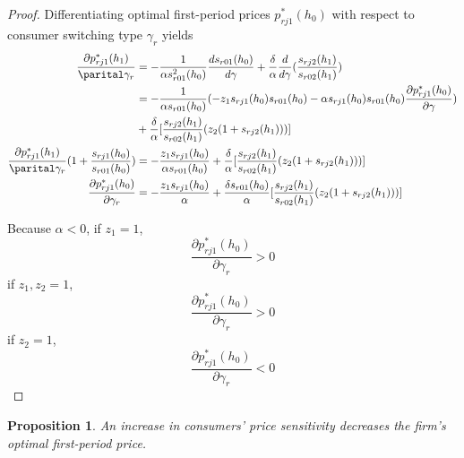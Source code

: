 \documentclass[12pt]{article}
\newtheorem{proposition}{Proposition}
\theoremstyle{definition}
\theoremstyle{remark}
\begin{document}
\begin{proof}
  Differentiating optimal first-period prices $p_{rj1}^*(h_0)$ with respect to
  consumer switching type $\gamma_r$ yields
  \begin{align*}
    \frac{\partial p_{rj1}^*(h_1)}{\parital\gamma_r} &= -\frac{1}{\alpha
    s_{r01}^2(h_0)}\frac{ds_{r01}(h_0)}{d\gamma} +
    \frac{\delta}{\alpha}\frac{d}{d\gamma}(\frac{s_{rj2}(h_1)}{s_{r02}(h_1)}) \\
    &= -\frac{1}{\alpha s_{r01}(h_0)}(-z_1s_{rj1}(h_0)s_{r01}(h_0) - \alpha
    s_{rj1}(h_0)s_{r01}(h_0)\frac{\partial p_{rj1}^*(h_0)}{\partial\gamma})  \\
    &+
    \frac{\delta}{\alpha}[\frac{s_{rj2}(h_1)}{s_{r02}(h_1)}(z_2(1+s_{rj2}(h_1)))] \\
    \frac{\partial p_{rj1}^*(h_1)}{\parital\gamma_r}(1+\frac{s_{rj1}(h_0)}{s_{r01}(h_0)}) &=
    -\frac{z_1s_{rj1}(h_0)}{\alpha s_{r01}(h_0)} +
    \frac{\delta}{\alpha}[\frac{s_{rj2}(h_1)}{s_{r02}(h_1)}(z_2(1+s_{rj2}(h_1)))] \\ 
    \frac{\partial
    p_{rj1}^*(h_0)}{\partial\gamma_r}&=-\frac{z_1s_{rj1}(h_0)}{\alpha} +
    \frac{\delta
    s_{r01}(h_0)}{\alpha}[\frac{s_{rj2}(h_1)}{s_{r02}(h_1)}(z_2(1+s_{rj2}(h_1)))]
  \end{align*}
  
  Because $\alpha < 0$, if $z_1=1$,
  \begin{equation}
    \frac{\partial p_{rj1}^*(h_0)}{\partial\gamma_r} > 0
  \end{equation}
  if $z_1, z_2=1$,
  \begin{equation}
    \frac{\partial p_{rj1}^*(h_0)}{\partial\gamma_r} > 0 
  \end{equation}
  if $z_2=1$,
  \begin{equation}
    \frac{\partial p_{rj1}^*(h_0)}{\partial\gamma_r} < 0 
  \end{equation}

\end{proof}

\begin{proposition}
\label{prop:three}
  An increase in consumers' price sensitivity decreases the firm's optimal
  first-period price.
\end{proposition}
\end{document}
